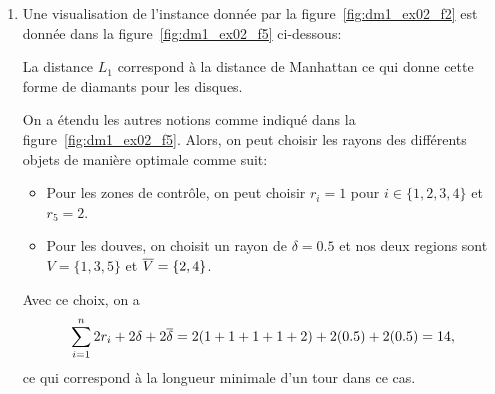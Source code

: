 {\begin{td-sol}[]
\begin{enumerate}
            On définit une solution duale par
            \begin{equation*}
                y_i = r_i, \qquad z = \delta + \ol\delta.
            \end{equation*}

            La valeur de l'objectif dual est alors
            \begin{equation*}
                \sum_{i=1}^n 2y_i + 2z
                =
                \sum_{i=1}^n 2r_i + 2(\delta+\ol\delta)
                =
                \sum_{i=1}^n 2r_i + 2\delta + 2\ol\delta,
            \end{equation*}
            qui correspond exactement à la borne obtenue à l'aide des douves.

            Les contraintes duales sont satisfaites car les zones de contrôle impliquent
            \begin{equation*}
                r_i + r_j \leq d_{ij}
            \end{equation*}
            pour les arêtes internes à \(V\) ou \(\ol V\), et l'absence d'intersection des douves implique
            \begin{equation*}
                r_i + r_j + \delta + \ol\delta \leq d_{ij}
            \end{equation*}
            pour les arêtes reliant \(V\) et \(\ol V\).

            Ainsi toute borne obtenue à l'aide de douves correspond à une solution réalisable du dual de \(P_2\).

            \item Une visualisation de l'instance donnée par la figure~\ref{fig:dm1_ex02_f2} est donnée dans la figure~\ref{fig:dm1_ex02_f5} ci-dessous:

            

            La distance \(L_1\) correspond à la distance de Manhattan ce qui donne cette forme de diamants pour les disques.

            On a étendu les autres notions comme indiqué dans la figure~\ref{fig:dm1_ex02_f5}.
            Alors, on peut choisir les rayons des différents objets de manière optimale comme suit:
            \begin{itemize}
                \item Pour les zones de contrôle, on peut choisir \(r_i = 1\) pour \(i\in \{1,2,3,4\}\) et \(r_5 = 2\).
                \item Pour les douves, on choisit un rayon de \(\delta = 0.5\) et nos deux regions sont \(V = \{1, 3, 5\}\) et \(\overline{V} = \{2, 4\}\).
            \end{itemize}
            Avec ce choix, on a
            \begin{equation*}
                \sum_{i=1}^n 2r_i + 2\delta + 2\overline{\delta} = 2(1+1+1+1+2) + 2(0.5) + 2(0.5) = 14,
            \end{equation*}
            ce qui correspond à la longueur minimale d'un tour dans ce cas.


\end{enumerate}
\end{td-sol}}
